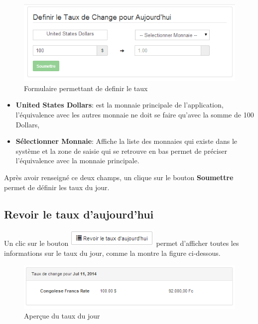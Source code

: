 \documentclass[12pt,a4paper]{report}
\begin{document}
\begin{figure}[h]
\begin{center}
\includegraphics[width=12cm]{pic/DefinirTaux.png}
\end{center}
\caption{Formulaire permettant de definir le taux}
\label{Formulaire permettant de definir le taux}
\end{figure}
\begin{itemize}
\item \textbf{United States Dollars}: est la monnaie principale de l'application, l'équivalence avec les autres monnaie ne doit se faire qu'avec la somme de 100 Dollars,
\item \textbf{Sélectionner Monnaie}: Affiche la liste des monnaies qui existe dans le système et la zone de saisie qui se retrouve en bas permet de préciser l'équivalence avec la monnaie principale.
\end{itemize}
Après avoir renseigné ce deux champs, un clique sur le bouton \textbf{Soumettre} permet de définir les taux du jour.

\subsection{Revoir le taux d'aujourd'hui}
Un clic sur le bouton \includegraphics[scale=0.7]{pic/RevoirTaux.png} permet d'afficher toutes les informations sur le taux du jour, comme la montre la figure ci-dessous.
\begin{figure}[h]
\begin{center}
\includegraphics[width=12cm]{pic/ShowRate.png}
\end{center}
\caption{Aperçue du taux du jour}
\label{Aperçue du taux du jour}
\end{figure}
\end{document}
